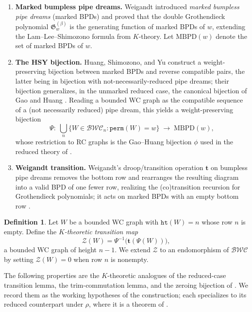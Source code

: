 \documentclass{amsart}
\theoremstyle{definition}
\newtheorem{definition}[lemma]{Definition}
\theoremstyle{remark}
\numberwithin{equation}{subsection}
\newcommand{\wof}[1]{\mathtt{perm}(#1)}
\newcommand{\hr}{\mathtt{ht}}
\newcommand{\BWC}{\mathcal{BWC}}
\newcommand{\lzeromap}{\mathscr{Z}}
\begin{document}
\begin{enumerate}
\item \textbf{Marked bumpless pipe dreams.} Weigandt \cite{Weigandt2021}
introduced \emph{marked bumpless pipe dreams} (marked BPDs) and proved that the
double Grothendieck polynomial $\mathfrak{G}^{(\beta)}_w$ is the generating
function of marked BPDs of $w$, extending the Lam--Lee--Shimozono formula from
$K$-theory. Let $\mathrm{MBPD}(w)$ denote the set of marked BPDs of $w$.

\item \textbf{The HSY bijection.} Huang, Shimozono, and Yu
\cite{HuangShimozonoYu2024} construct a weight-preserving bijection between
marked BPDs and reverse compatible pairs, the latter being in bijection with
not-necessarily-reduced pipe dreams; their bijection generalizes, in the
unmarked reduced case, the canonical bijection of Gao and Huang
\cite{GaoHuang2023}. Reading a bounded WC graph as the compatible sequence of a
(not necessarily reduced) pipe dream, this yields a weight-preserving bijection
$$\Psi:\;\bigcup_{n}\{W\in\BWC_n:\wof{W}=w\}\;\longrightarrow\;\mathrm{MBPD}(w),$$
whose restriction to RC graphs is the Gao--Huang bijection $\phi$ used in the
reduced theory of \cite{samuelmolev}.

\item \textbf{Weigandt transition.} Weigandt's droop/transition operation
$\mathbf{t}$ on bumpless pipe dreams removes the bottom row and rearranges the
resulting diagram into a valid BPD of one fewer row, realizing the
(co)transition recursion for Grothendieck polynomials; it acts on marked BPDs
with an empty bottom row \cite{Weigandt2021,HuangShimozonoYu2024}.
\end{enumerate}

\begin{definition}\label{definition:lzeromap}
Let $W$ be a bounded WC graph with $\hr(W)=n$ whose row $n$ is empty. Define the
\emph{$K$-theoretic transition map}
$$\lzeromap(W)=\Psi^{-1}\bigl(\mathbf{t}(\Psi(W))\bigr),$$
a bounded WC graph of height $n-1$. We extend $\lzeromap$ to an endomorphism of
$\BWC$ by setting $\lzeromap(W)=0$ when row $n$ is nonempty.
\end{definition}

The following properties are the $K$-theoretic analogues of the reduced-case
transition lemma, the trim-commutation lemma, and the zeroing bijection of
\cite{samuelmolev}. We record them as the working hypotheses of the
construction; each specializes to its reduced counterpart under $\rho$, where it
is a theorem of \cite{samuelmolev}.
\end{document}
